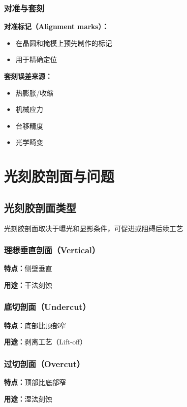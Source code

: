 \documentclass[UTF8,12pt,a4paper]{ctexart}
\begin{document}
\subsubsection{对准与套刻}

\textbf{对准标记（Alignment marks）：}
\begin{itemize}
    \item 在晶圆和掩模上预先制作的标记
    \item 用于精确定位
\end{itemize}

\textbf{套刻误差来源：}
\begin{itemize}
    \item 热膨胀/收缩
    \item 机械应力
    \item 台移精度
    \item 光学畸变
\end{itemize}

\section{光刻胶剖面与问题}

\subsection{光刻胶剖面类型}

光刻胶剖面取决于曝光和显影条件，可促进或阻碍后续工艺

\subsubsection{理想垂直剖面（Vertical）}

\textbf{特点：}侧壁垂直

\textbf{用途：}干法刻蚀

\subsubsection{底切剖面（Undercut）}

\textbf{特点：}底部比顶部窄

\textbf{用途：}剥离工艺（Lift-off）

\subsubsection{过切剖面（Overcut）}

\textbf{特点：}顶部比底部窄

\textbf{用途：}湿法刻蚀
\end{document}
